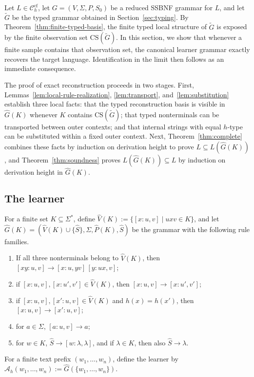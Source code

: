 \documentclass[11pt,a4paper]{article}
\newcommand{\CS}{\mathrm{CS}}
\newcommand{\cf}{\mathrm{cf}}
\newcommand{\Ccf}[1]{\mathcal C_{#1}^{\cf}}
\begin{document}
Let $L\in\Ccf{h}$, let $G=(V,\Sigma,P,S_0)$ be a reduced SSBNF grammar for $L$, and let $\widetilde G$ be the typed grammar obtained in Section~\ref{sec:typing}. By Theorem~\ref{thm:finite-typed-basis}, the finite typed local structure of $\widetilde G$ is exposed by the finite observation set $\CS(\widetilde G)$. In this section, we show that whenever a finite sample contains that observation set, the canonical learner grammar exactly recovers the target language. Identification in the limit then follows as an immediate consequence.

The proof of exact reconstruction proceeds in two stages. First, Lemmas~\ref{lem:local-rule-realization}, \ref{lem:transport}, and~\ref{lem:substitution} establish three local facts: that the typed reconstruction basis is visible in $\hat G(K)$ whenever $K$ contains $\CS(\widetilde G)$; that typed nonterminals can be transported between outer contexts; and that internal strings with equal $h$-type can be substituted within a fixed outer context. Next, Theorem~\ref{thm:complete} combines these facts by induction on derivation height to prove $L\subseteq L(\hat G(K))$, and Theorem~\ref{thm:soundness} proves $L(\hat G(K))\subseteq L$ by induction on derivation height in $\hat G(K)$.

\subsection{The learner}\label{subsec:learner}

For a finite set $K\subseteq\Sigma^*$, define $\hat V(K):=\{[x:u,v]\mid uxv\in K\}$, and let $\hat G(K)=(\hat V(K)\cup\{\hat S\},\Sigma,\hat P(K),\hat S)$ be the grammar with the following rule families.
\begin{enumerate}[label=\textup{(\arabic*)},nosep,leftmargin=2.2em]
\item If all three nonterminals belong to $\hat V(K)$, then $[xy:u,v]\to[x:u,yv]\,[y:ux,v]$;
\item if $[x:u,v],[x:u',v']\in\hat V(K)$, then $[x:u,v]\to[x:u',v']$;
\item if $[x:u,v],[x':u,v]\in\hat V(K)$ and $h(x)=h(x')$, then $[x:u,v]\to[x':u,v]$;
\item for $a\in\Sigma$, $[a:u,v]\to a$;
\item for $w\in K$, $\hat S\to[w:\lambda,\lambda]$, and if $\lambda\in K$, then also $\hat S\to\lambda$.
\end{enumerate}
For a finite text prefix $(w_1,\dots,w_n)$, define the learner by $\mathcal A_h(w_1,\dots,w_n):=\hat G(\{w_1,\dots,w_n\})$.
\end{document}
